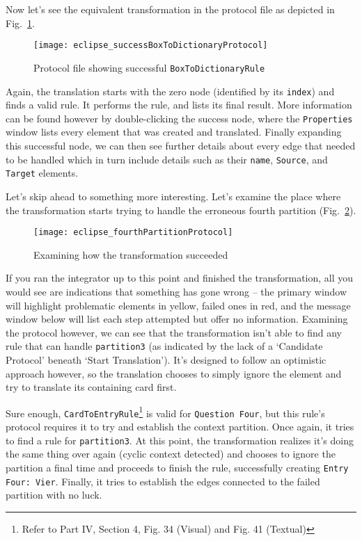 \newpage

Now let's see the equivalent transformation in the protocol file as depicted in Fig.~\ref{eclipse:protocolFWD}.

\vspace{0.5cm}

\begin{figure}[htbp]
\begin{center} 
  \texttt{[image: eclipse\_successBoxToDictionaryProtocol]}
  \caption{Protocol file showing successful \texttt{BoxToDictionaryRule}}  
  \label{eclipse:protocolFWD}
\end{center}
\end{figure}

Again, the translation starts with the zero node (identified by its \texttt{index}) and finds a valid rule. It performs the rule, and lists its final result.
More information can be found however by double-clicking the success node, where the \texttt{Properties} window lists every element that was created and
translated. Finally expanding this successful node, we can then see further details about every edge that needed to be handled which in turn include details
such as their \texttt{name}, \texttt{Source}, and \texttt{Target} elements.

Let's skip ahead to something more interesting. Let's examine the place where the transformation starts trying to handle the erroneous fourth partition
(Fig.~\ref{eclipse:fourthPartition}).

\newpage

\begin{figure}[htbp]
\begin{center} 
  \texttt{[image: eclipse\_fourthPartitionProtocol]}
  \caption{Examining how the transformation succeeded}  
  \label{eclipse:fourthPartition}
\end{center}
\end{figure}

If you ran the integrator up to this point and finished the transformation, all you would see are indications that something has gone wrong -- the primary
window will highlight problematic elements in yellow, failed ones in red, and the message window below will list each step attempted but offer no
information. Examining the protocol however, we can see that the transformation isn't able to find any rule that can handle \texttt{partition3} (as indicated by
the lack of a `Candidate Protocol' beneath `Start Translation'). It's designed to follow an optimistic approach however, so the translation chooses to
simply ignore the element and try to translate its containing card first.

Sure enough, \texttt{CardToEntryRule}\footnote{Refer to Part IV, Section 4, Fig. 34 (Visual) and Fig. 41 (Textual)} is valid for \texttt{Question Four}, but
this rule's protocol requires it to try and establish the context partition. Once again, it tries to find a rule for \texttt{partition3}. At this point, the
transformation realizes it's doing the same thing over again (cyclic context detected) and chooses to ignore the partition a final time and proceeds to finish
the rule, successfully creating \texttt{Entry Four: Vier}. Finally, it tries to establish the edges connected to the failed partition with no luck.
